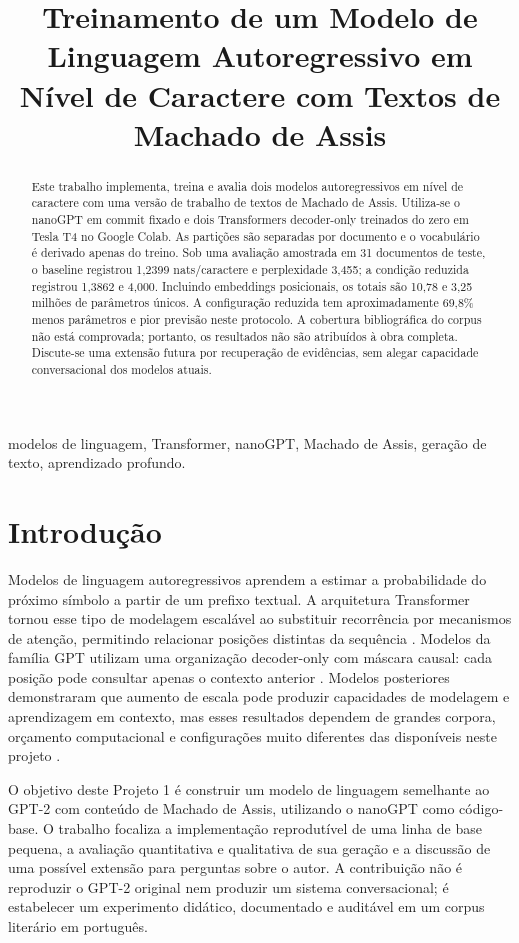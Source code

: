 \documentclass[conference]{IEEEtran}
\title{Treinamento de um Modelo de Linguagem Autoregressivo em Nível de Caractere com Textos de Machado de Assis}
\author{%
  \IEEEauthorblockN{FABRICIO FERNANDES SANTANA}
  \IEEEauthorblockA{Departamento de Ciência da Computação\\
  Universidade de Brasília\\
  Matrícula: preencher antes da entrega}
}
\begin{document}
\maketitle

\begin{abstract}
Este trabalho implementa, treina e avalia dois modelos autoregressivos em nível de caractere com uma versão de trabalho de textos de Machado de Assis. Utiliza-se o nanoGPT em commit fixado e dois Transformers decoder-only treinados do zero em Tesla T4 no Google Colab. As partições são separadas por documento e o vocabulário é derivado apenas do treino. Sob uma avaliação amostrada em 31 documentos de teste, o baseline registrou 1,2399 nats/caractere e perplexidade 3,455; a condição reduzida registrou 1,3862 e 4,000. Incluindo embeddings posicionais, os totais são 10,78 e 3,25 milhões de parâmetros únicos. A configuração reduzida tem aproximadamente 69,8\% menos parâmetros e pior previsão neste protocolo. A cobertura bibliográfica do corpus não está comprovada; portanto, os resultados não são atribuídos à obra completa. Discute-se uma extensão futura por recuperação de evidências, sem alegar capacidade conversacional dos modelos atuais.
\end{abstract}

\begin{IEEEkeywords}
modelos de linguagem, Transformer, nanoGPT, Machado de Assis, geração de texto, aprendizado profundo.
\end{IEEEkeywords}

\section{Introdução}

Modelos de linguagem autoregressivos aprendem a estimar a probabilidade do próximo símbolo a partir de um prefixo textual. A arquitetura Transformer tornou esse tipo de modelagem escalável ao substituir recorrência por mecanismos de atenção, permitindo relacionar posições distintas da sequência \cite{vaswani2017}. Modelos da família GPT utilizam uma organização decoder-only com máscara causal: cada posição pode consultar apenas o contexto anterior \cite{radford2019}. Modelos posteriores demonstraram que aumento de escala pode produzir capacidades de modelagem e aprendizagem em contexto, mas esses resultados dependem de grandes corpora, orçamento computacional e configurações muito diferentes das disponíveis neste projeto \cite{brown2020}.

O objetivo deste Projeto 1 é construir um modelo de linguagem semelhante ao GPT-2 com conteúdo de Machado de Assis, utilizando o nanoGPT como código-base. O trabalho focaliza a implementação reprodutível de uma linha de base pequena, a avaliação quantitativa e qualitativa de sua geração e a discussão de uma possível extensão para perguntas sobre o autor. A contribuição não é reproduzir o GPT-2 original nem produzir um sistema conversacional; é estabelecer um experimento didático, documentado e auditável em um corpus literário em português.
\end{document}
